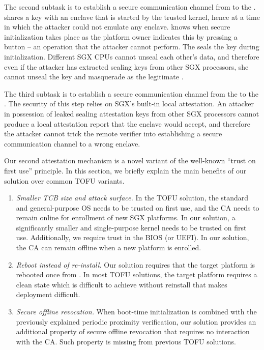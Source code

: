 The second subtask is to establish a secure communication channel from \device to the \nameclave. \device shares a key with an enclave that is started by the trusted \name kernel, hence at a time in which the attacker could not emulate any enclave. \device knows when secure initialization takes place as the platform owner indicates this by pressing a button -- an operation that the attacker cannot perform. The \nameclave seals the key during initialization. Different SGX CPUs cannot unseal each other's data, and therefore even if the attacker has extracted sealing keys from other SGX processors, she cannot unseal the key and masquerade as the legitimate \nameclave. 

The third subtask is to establish a secure communication channel from the \nameclave to the \app. The security of this step relies on SGX's built-in local attestation. An attacker in possession of leaked sealing attestation keys from other SGX processors cannot produce a local attestation report that the \name enclave would accept, and therefore the attacker cannot trick the remote verifier into establishing a secure communication channel to a wrong enclave.


 Our second attestation mechanism is a novel variant of the well-known ``trust on first use'' principle. In this section, we briefly explain the main benefits of our solution over common TOFU variants. 

\begin{enumerate}
\item \emph{Smaller TCB size and attack surface.} 
In the TOFU solution, the standard and general-purpose OS needs to be trusted on first use, and the CA needs to remain online for enrollment of new SGX platforms. In our solution, a significantly smaller and single-purpose kernel needs to be trusted on first use. Additionally, we require trust in the BIOS (or UEFI). In our solution, the CA can remain offline when a new platform is enrolled.


\item \emph{Reboot instead of re-install.} Our solution requires that the target platform is rebooted once from \device. In most TOFU solutions, the target platform requires a clean state which is difficult to achieve without reinstall that makes deployment difficult.


\item \emph{Secure offline revocation.} When boot-time initialization is combined with the previously explained periodic proximity verification, our solution provides an additional property of secure offline revocation that requires no interaction with the CA. Such property is missing from previous TOFU solutions.

\end{enumerate}

